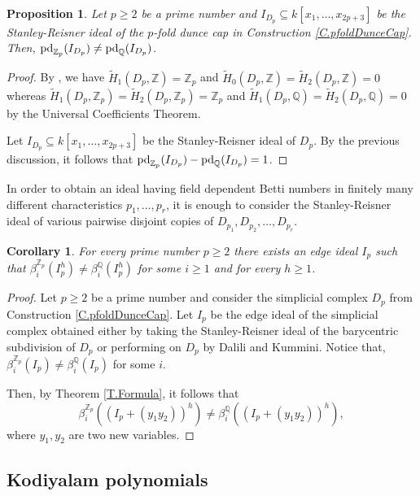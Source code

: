 \documentclass[11pt,oneside]{amsart}
\theoremstyle{plain}
\newtheorem{proposition}[theorem]{Proposition}
\newtheorem{corollary}[theorem]{Corollary}
\theoremstyle{definition}
\newcommand{\pd}{{\rm pd}}
\newcommand{\Q}{\mathbb{Q}}
\newcommand{\Z}{\mathbb{Z}}
\begin{document}
\begin{proposition}\label{P.pfoldDunceCap}
Let $p \geq 2$ be a prime number and $I_{D_p} \subseteq k[x_1, \ldots, x_{2p+3}]$ be the Stanley-Reisner ideal of the $p$-fold dunce cap in Construction \ref{C.pfoldDunceCap}. Then, $\pd_{\Z_p}(I_{D_p}) \neq \pd_\Q(I_{D_p})$.
\end{proposition}

\begin{proof}
By \cite[Example 5.11]{SW11}, we have $\widetilde{H}_1(D_p,\mathbb{Z})=\mathbb{Z}_p$ and $\widetilde{H}_0(D_p,\mathbb{Z})=\widetilde{H}_2(D_p,\mathbb{Z})=0$ whereas $\widetilde{H}_1(D_p,\mathbb{Z}_p)=\widetilde{H}_2(D_p,\mathbb{Z}_p)=\mathbb{Z}_p$ and  $\widetilde{H}_1(D_p,\mathbb{Q})=\widetilde{H}_2(D_p,\mathbb{Q})=0$ by the Universal Coefficients Theorem. 

Let $I_{D_p} \subseteq k[x_1,\dots,x_{2p+3}]$ be the Stanley-Reisner ideal of $D_p$. By the previous discussion, it follows that $\pd_{\Z_p}(I_{D_p}) - \pd_{\Q}(I_{D_p}) = 1$.
\end{proof}

In order to obtain an ideal having field dependent Betti numbers in finitely many different characteristics $p_1,\dots,p_r$, it is enough to consider the Stanley-Reisner ideal of various pairwise disjoint copies of $D_{p_1},D_{p_2},\ldots,D_{p_r}$.

\begin{corollary}\label{C.pfoldDunceCapCorollary}
For every prime number $p \geq 2$ there exists an edge ideal $I_p$ such that $\beta_i^{\mathbb{Z}_p}(I_p^h) \neq \beta_i^\mathbb{Q}(I_p^h)$ for some $i \geq 1$ and for every $h \geq 1$.
\end{corollary}

\begin{proof}
Let $p \geq 2$ be a prime number and consider the simplicial complex $D_p$ from Construction \ref{C.pfoldDunceCap}. Let $I_p$ be the edge ideal of the simplicial complex obtained either by taking  the Stanley-Reisner ideal of the barycentric subdivision of $D_p$ or performing on $D_p$ \cite[Construction 4.4]{DK14} by Dalili and Kummini. Notice that, $\beta^{\Z_p}_i (I_p) \neq \beta^\Q_i (I_p)$ for some $i$.

Then, by Theorem \ref{T.Formula}, it follows that
\[
\beta^{\Z_p}_i ((I_p + (y_1y_2))^h) \neq \beta^{\Q}_i ((I_p + (y_1y_2))^h),
\]
where $y_1,y_2$ are two new variables.
\end{proof}


\subsection{Kodiyalam polynomials}
\end{document}

